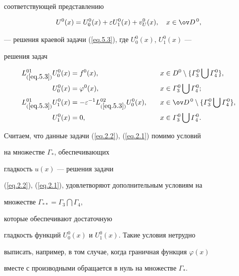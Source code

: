 соответствующей представлению


$$


U^0(x)=U^0_0(x)+\varepsilon U^0_1(x)+v^0_U(x), \quad x\in \ov D^{\,0},


$$


--- решения краевой задачи (\ref{eq.5.3}), где $U^0_0(x)$, $U^0_1(x)$ ---


решения задач


\begin{alignat*}{2}


L^{01}_{(\ref{eq.5.3})} U^0_0(x)&=f^0(x),


&\quad x&\in D^0\setminus \{\varGamma^0_3\bigcup \varGamma^0_4\},\\


%


U^0_0(x)&=\varphi^0(x),


&\quad x&\in \varGamma^0_3\bigcup \varGamma^0_4;\\


%


L^{01}_{(\ref{eq.5.3})} U^0_1(x)&=


-\varepsilon^{-1} L^{02}_{(\ref{eq.5.3})}U^0_0(x),


&\quad x&\in \ov D^{\,0}\setminus \{\varGamma^0_3\bigcup \varGamma^0_4\},\\


%


U^0_1(x)&=0, &\quad  x&\in \varGamma^0_3\bigcup \varGamma^0_4.


\end{alignat*}


Считаем, что данные задачи (\ref{eq.2.2}), (\ref{eq.2.1}) помимо условий


на множестве $\varGamma_*$, обеспечивающих 


гладкость $u(x)$ --- решения задачи


(\ref{eq.2.2}), (\ref{eq.2.1}), удовлетворяют дополнительным условиям на


множестве $\varGamma_{**}=\varGamma_3\bigcap \varGamma_4$,


которые обеспечивают достаточную


гладкость функций $U^0_0(x)$ и $U^0_1(x)$. Такие условия нетрудно


выписать, например, в том случае, когда граничная функция $\varphi(x)$


вместе с производными обращается в нуль на множестве $\varGamma_*$.





